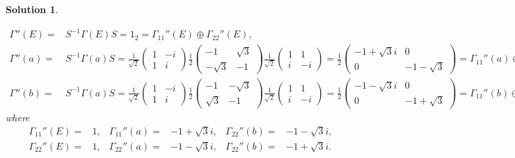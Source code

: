 \documentclass[UTF8,10pt,a4paper]{article}
\theoremstyle{Problem}
\theoremstyle{Solution}
\newtheorem*{sol}{Solution}
\begin{document}
\begin{sol}
\begin{enumerate}
        \begin{align}
            \Gamma''(E)=&S^{-1}\Gamma(E)S=1_2=\Gamma_{11}''(E)\oplus\Gamma_{22}''(E),\\
            \Gamma''(a)=&S^{-1}\Gamma(a)S=\frac{1}{\sqrt{2}}\left(\begin{matrix}
                1&-i\\
                1&i
            \end{matrix}\right)\frac{1}{2}\left(\begin{matrix}
                -1&\sqrt{3}\\
                -\sqrt{3}&-1
            \end{matrix}\right)\frac{1}{\sqrt{2}}\left(\begin{matrix}
                1&1\\
                i&-i
            \end{matrix}\right)=\frac{1}{2}\left(\begin{matrix}
                -1+\sqrt{3}i&0\\
                0&-1-\sqrt{3}
            \end{matrix}\right)=\Gamma_{11}''(a)\oplus\Gamma_{22}''(a),\\
            \Gamma''(b)=&S^{-1}\Gamma(a)S=\frac{1}{\sqrt{2}}\left(\begin{matrix}
                1&-i\\
                1&i
            \end{matrix}\right)\frac{1}{2}\left(\begin{matrix}
                -1&-\sqrt{3}\\
                \sqrt{3}&-1
            \end{matrix}\right)\frac{1}{\sqrt{2}}\left(\begin{matrix}
                1&1\\
                i&-i
            \end{matrix}\right)=\frac{1}{2}\left(\begin{matrix}
                -1-\sqrt{3}i&0\\
                0&-1+\sqrt{3}
            \end{matrix}\right)=\Gamma_{11}''(b)\oplus\Gamma_{22}''(b).
        \end{align}
        where
        \begin{align}
            \Gamma_{11}''(E)=&1,&\Gamma_{11}''(a)=&-1+\sqrt{3}i,&\Gamma_{22}''(b)=&-1-\sqrt{3}i,\\
            \Gamma_{22}''(E)=&1,&\Gamma_{22}''(a)=&-1-\sqrt{3}i,&\Gamma_{22}''(b)=&-1+\sqrt{3}i.
        \end{align}
    \end{enumerate}
\end{sol}
\end{document}

